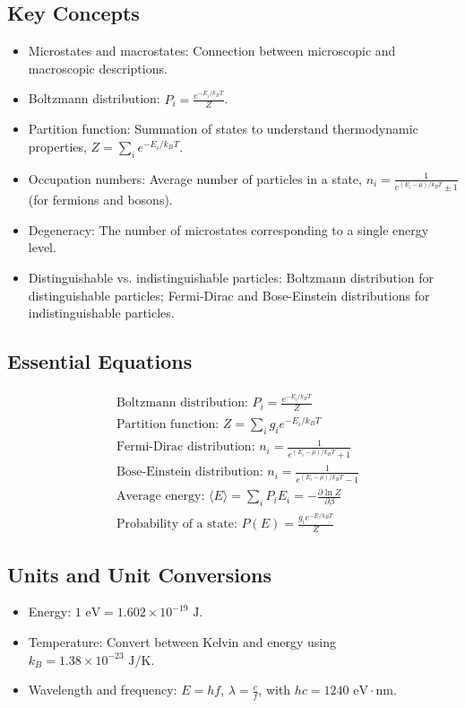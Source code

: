 \documentclass{article}
\newcommand{\eqbox}[1]{\begin{tcolorbox}[colback=gray!10] #1 \end{tcolorbox}}
\newcommand{\conceptbox}[1]{\begin{tcolorbox}[colback=blue!10] #1 \end{tcolorbox}}
\newcommand{\tipbox}[1]{\begin{tcolorbox}[colback=green!10] #1 \end{tcolorbox}}
\begin{document}
\subsection{Key Concepts}
\conceptbox{
\begin{itemize}
    \item Microstates and macrostates: Connection between microscopic and macroscopic descriptions.
    \item Boltzmann distribution: $P_i = \frac{e^{-E_i/k_BT}}{Z}$.
    \item Partition function: Summation of states to understand thermodynamic properties, $Z = \sum_i e^{-E_i/k_BT}$.
    \item Occupation numbers: Average number of particles in a state, $n_i = \frac{1}{e^{(E_i-\mu)/k_BT} \pm 1}$ (for fermions and bosons).
    \item Degeneracy: The number of microstates corresponding to a single energy level.
    \item Distinguishable vs. indistinguishable particles: Boltzmann distribution for distinguishable particles; Fermi-Dirac and Bose-Einstein distributions for indistinguishable particles.
\end{itemize}
}

\subsection{Essential Equations}
\eqbox{
\begin{align*}
    &\text{Boltzmann distribution: } P_i = \frac{e^{-E_i/k_BT}}{Z} \\
    &\text{Partition function: } Z = \sum_i g_i e^{-E_i/k_BT} \\
    &\text{Fermi-Dirac distribution: } n_i = \frac{1}{e^{(E_i-\mu)/k_BT} + 1} \\
    &\text{Bose-Einstein distribution: } n_i = \frac{1}{e^{(E_i-\mu)/k_BT} - 1} \\
    &\text{Average energy: } \langle E \rangle = \sum_i P_i E_i = -\frac{\partial \ln Z}{\partial \beta} \\
    &\text{Probability of a state: } P(E) = \frac{g_i e^{-E/k_BT}}{Z}
\end{align*}
}

\subsection{Units and Unit Conversions}
\tipbox{
\begin{itemize}
    \item Energy: $1 \text{ eV} = 1.602 \times 10^{-19} \text{ J}$.
    \item Temperature: Convert between Kelvin and energy using $k_B = 1.38 \times 10^{-23} \text{ J/K}$.
    \item Wavelength and frequency: $E = hf$, $\lambda = \frac{c}{f}$, with $hc = 1240 \text{ eV} \cdot \text{nm}$.
\end{itemize}
}
\end{document}
